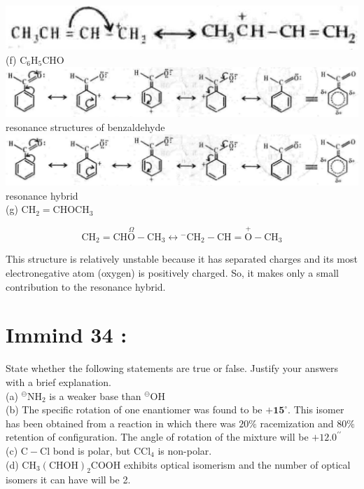 \documentclass[10pt]{article}
\begin{document}
\includegraphics[max width=\textwidth, center]{2025_01_28_8470952b98110cec3aabg-126(1)}\\
(f) $\mathrm{C}_{6} \mathrm{H}_{5} \mathrm{CHO}$\\
\includegraphics[max width=\textwidth, center]{2025_01_28_8470952b98110cec3aabg-126(5)}\\
resonance structures of benzaldehyde\\
\includegraphics[max width=\textwidth, center]{2025_01_28_8470952b98110cec3aabg-126(6)}\\
resonance hybrid\\
(g) $\mathrm{CH}_{2}=\mathrm{CHOCH}_{3}$

$$
\mathrm{CH}_{2}=\mathrm{CH} \stackrel{\Omega}{\mathrm{O}}-\mathrm{CH}_{3} \longleftrightarrow{ }^{-} \mathrm{CH}_{2}-\mathrm{CH}=\stackrel{+}{\mathrm{O}}-\mathrm{CH}_{3}
$$

This structure is relatively unstable because it has separated charges and its most electronegative atom (oxygen) is positively charged. So, it makes only a small contribution to the resonance hybrid.

\section*{Immind 34 :}
State whether the following statements are true or false. Justify your answers with a brief explanation.\\
(a) ${ }^{\ominus} \mathrm{NH}_{2}$ is a weaker base than ${ }^{\ominus} \mathrm{OH}$\\
(b) The specific rotation of one enantiomer was found to be $+\mathbf{1 5}^{\circ}$. This isomer has been obtained from a reaction in which there was $20 \%$ racemization and $80 \%$ retention of configuration. The angle of rotation of the mixture will be $+12.0^{\prime \prime}$\\
(c) $\mathrm{C}-\mathrm{Cl}$ bond is polar, but $\mathrm{CCl}_{4}$ is non-polar.\\
(d) $\mathrm{CH}_{3}(\mathrm{CHOH})_{2} \mathrm{COOH}$ exhibits optical isomerism and the number of optical isomers it can have will be 2.
\end{document}
